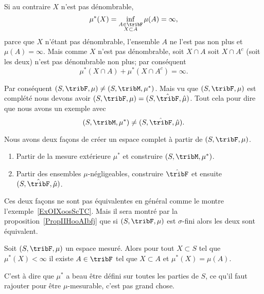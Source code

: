 \begin{example}
\begin{subproof}
        Si au contraire \( X\) n'est pas dénombrable,
        \begin{equation}
            \mu^*(X)=\inf_{\substack{A\in\tribF\\X\subset A}}\mu(A)=\infty,
        \end{equation}
         parce que \( X\) n'étant pas dénombrable, l'ensemble \( A\) ne l'est pas non plus et \( \mu(A)=\infty\). Mais comme \( X\) n'est pas dénombrable, soit \( X\cap A\) soit \( X\cap A^c\) (soit les deux) n'est pas dénombrable non plus; par conséquent
         \begin{equation}
             \mu^*(X\cap A)+\mu^*(X\cap A^c)=\infty.
         \end{equation}
    \end{subproof}

    Par conséquent \( (S,\tribF,\mu) \neq (S,\tribM,\mu^*)\). Mais vu que \( (S,\tribF,\mu)\) est complété nous devons avoir \( (S,\tribF,\mu)=(S,\hat\tribF,\hat\mu)\). Tout cela pour dire que nous avons un exemple avec
    \begin{equation}
        (S,\tribM,\mu^*)\neq (S,\hat\tribF,\hat \mu).
    \end{equation}
\end{example}

Nous avons deux façons de créer un espace complet à partir de \( (S,\tribF,\mu)\).
\begin{enumerate}
    \item
        Partir de la mesure extérieure \( \mu^*\) et construire \( (S,\tribM,\mu^*)\).
    \item
        Partir des ensembles \( \mu\)-négligeables, construire \( \hat\tribF\) et ensuite \( (S,\hat\tribF,\hat\mu)\).
\end{enumerate}
Ces deux façons ne sont pas équivalentes en général comme le montre l'exemple~\ref{ExOIXoosScTC}. Mais il sera montré par la proposition~\ref{PropIIHooAIbfj} que si \( (S,\tribF,\mu)\) est \( \sigma\)-fini alors les deux sont équivalent.

\begin{lemma}   \label{LemAESoofkMpi}
    Soit \( (S,\tribF,\mu)\) un espace mesuré. Alors pour tout \( X\subset S\) tel que \( \mu^*(X)<\infty\) il existe \( A\in\tribF\) tel que \( X\subset A\) et \( \mu^*(X)=\mu(A)\).
\end{lemma}
C'est à dire que \( \mu^*\) a beau être défini sur toutes les parties de \( S\), ce qu'il faut rajouter pour être \( \mu\)-mesurable, c'est pas grand chose.

